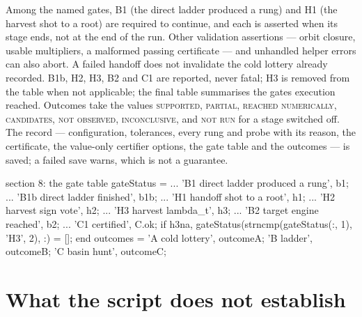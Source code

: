 \documentclass[11pt]{article}
\begin{document}
\begin{rig}
Among the named gates, B1 (the direct ladder produced a rung) and H1 (the
harvest shot to a root) are required to continue, and each is asserted when
its stage ends, not at the end of the run. Other validation assertions ---
orbit closure, usable multipliers, a malformed passing certificate --- and
unhandled helper errors can also abort. A failed handoff does not invalidate
the cold lottery already recorded. B1b, H2, H3, B2 and C1 are reported,
never fatal; H3 is removed from the table when not applicable; the final
table summarises the gates execution reached. Outcomes take the values
\textsc{supported}, \textsc{partial}, \textsc{reached numerically},
\textsc{candidates}, \textsc{not observed}, \textsc{inconclusive}, and
\textsc{not run} for a stage switched off. The record --- configuration,
tolerances, every rung and probe with its reason, the certificate, the
value-only certifier options, the gate table and the outcomes --- is saved;
a failed save warns, which is not a guarantee.
\end{rig}

\begin{snippet}{section 8: the gate table}
gateStatus = { ...
    'B1  direct ladder produced a rung', b1; ...
    'B1b direct ladder finished',        b1b; ...
    'H1  handoff shot to a root',        h1; ...
    'H2  harvest sign vote',             h2; ...
    'H3  harvest lambda_t',              h3; ...
    'B2  target engine reached',         b2; ...
    'C1  certified',                     C.ok};
if h3na, gateStatus(strncmp(gateStatus(:, 1), 'H3', 2), :) = []; end   %
outcomes = {'A cold lottery', outcomeA; 'B ladder', outcomeB; 'C basin hunt', outcomeC};
\end{snippet}

\section{What the script does not establish}
\end{document}
